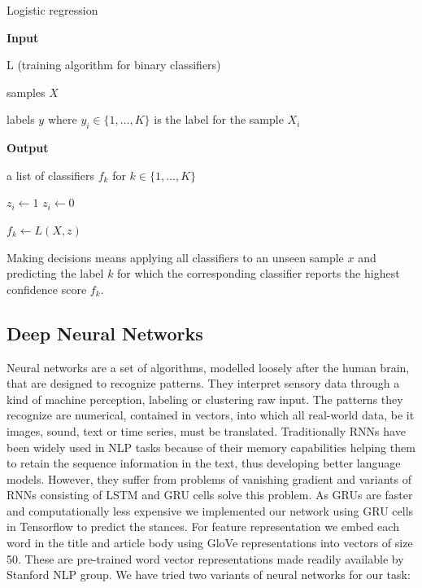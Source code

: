 \documentclass[11.5pt]{article}
\begin{document}
\begin{algorithm}[H]
  \caption{Logistic regression}\label{logistic}
  \textbf{Input}

  \hspace*{\algorithmicindent}L (training algorithm for binary classifiers)

  \hspace*{\algorithmicindent}samples $X$

  \hspace*{\algorithmicindent}labels $y$ where $y_i \in \{1, ..., K\}$ is the label for the sample $X_i$ 

  \textbf{Output}

  \hspace*{\algorithmicindent}a list of classifiers $f_k$ for $k \in \{1, ..., K\}$

  \begin{algorithmic}[1]
    \State $z_i \gets 1$
    \Else
    \State $z_i \gets 0$
    \EndIf

    \State $f_k\gets L(X, z)$
    \EndFor
    \EndProcedure
  \end{algorithmic}
\end{algorithm}

Making decisions means applying all classifiers to an unseen sample $x$ and predicting the label $k$ for which 
the corresponding classifier reports the highest confidence score $f_k$.
 
\subsection{Deep Neural Networks}

Neural networks are a set of algorithms, modelled loosely after the human brain, that are designed to recognize patterns. They interpret sensory data through a kind of machine perception, labeling or clustering raw input. The patterns they recognize are numerical, contained in vectors, into which all real-world data, be it images, sound, text or time series, must be translated. 
Traditionally RNNs have been widely used in NLP tasks because of their memory capabilities helping them to retain the sequence information in the text, thus developing better language models. However, they suffer from problems of vanishing gradient and variants of RNNs consisting of LSTM and GRU cells solve this problem. As GRUs are faster and computationally less expensive we implemented our network using GRU cells in Tensorflow to predict the stances. For feature representation we embed each word in the title and article body using GloVe representations into vectors of size 50. These are pre-trained word vector representations made readily available by Stanford NLP group. We have tried two variants of neural networks for our task:
\end{document}
